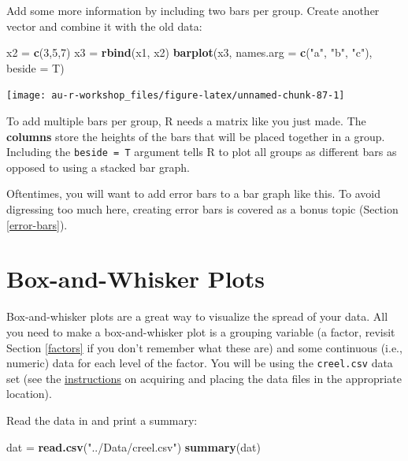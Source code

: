 \documentclass[]{book}
\newenvironment{Shaded}{\begin{snugshade}}{\end{snugshade}}
\newcommand{\KeywordTok}[1]{\textcolor[rgb]{0.13,0.29,0.53}{\textbf{#1}}}
\newcommand{\DataTypeTok}[1]{\textcolor[rgb]{0.13,0.29,0.53}{#1}}
\newcommand{\DecValTok}[1]{\textcolor[rgb]{0.00,0.00,0.81}{#1}}
\newcommand{\StringTok}[1]{\textcolor[rgb]{0.31,0.60,0.02}{#1}}
\newcommand{\NormalTok}[1]{#1}
\theoremstyle{definition}
\theoremstyle{definition}
\theoremstyle{definition}
\theoremstyle{remark}
\begin{document}
Add some more information by including two bars per group. Create
another vector and combine it with the old data:

\begin{Shaded}
\begin{Highlighting}[]
\NormalTok{x2 =}\StringTok{ }\KeywordTok{c}\NormalTok{(}\DecValTok{3}\NormalTok{,}\DecValTok{5}\NormalTok{,}\DecValTok{7}\NormalTok{)}
\NormalTok{x3 =}\StringTok{ }\KeywordTok{rbind}\NormalTok{(x1, x2)}
\KeywordTok{barplot}\NormalTok{(x3, }\DataTypeTok{names.arg =} \KeywordTok{c}\NormalTok{(}\StringTok{"a"}\NormalTok{, }\StringTok{"b"}\NormalTok{, }\StringTok{"c"}\NormalTok{), }\DataTypeTok{beside =}\NormalTok{ T)}
\end{Highlighting}
\end{Shaded}

\begin{center}\texttt{[image: au-r-workshop\_files/figure-latex/unnamed-chunk-87-1]} \end{center}

To add multiple bars per group, R needs a matrix like you just made. The
\textbf{columns} store the heights of the bars that will be placed
together in a group. Including the \texttt{beside\ =\ T} argument tells
R to plot all groups as different bars as opposed to using a stacked bar
graph.

Oftentimes, you will want to add error bars to a bar graph like this. To
avoid digressing too much here, creating error bars is covered as a
bonus topic (Section \ref{error-bars}).

\section{Box-and-Whisker Plots}\label{box-whisker}

Box-and-whisker plots are a great way to visualize the spread of your
data. All you need to make a box-and-whisker plot is a grouping variable
(a factor, revisit Section \ref{factors} if you don't remember what
these are) and some continuous (i.e., numeric) data for each level of
the factor. You will be using the \texttt{creel.csv} data set (see the
\protect\hyperlink{data-sets}{instructions} on acquiring and placing the
data files in the appropriate location).

Read the data in and print a summary:

\begin{Shaded}
\begin{Highlighting}[]
\NormalTok{dat =}\StringTok{ }\KeywordTok{read.csv}\NormalTok{(}\StringTok{"../Data/creel.csv"}\NormalTok{)}
\KeywordTok{summary}\NormalTok{(dat)}
\end{Highlighting}
\end{Shaded}
\end{document}
